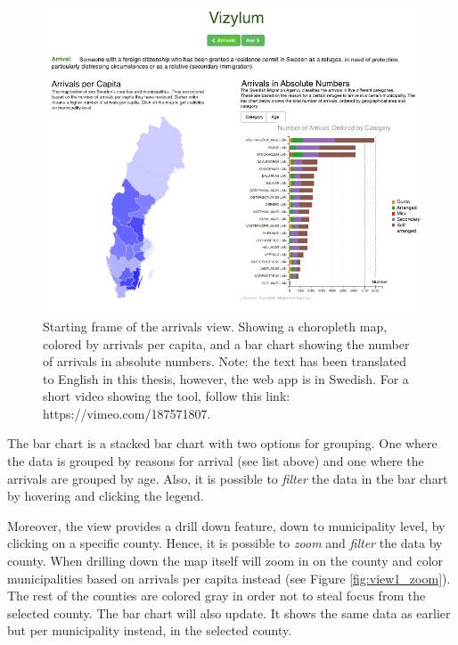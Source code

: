 \documentclass{acmtog} %
\begin{document}
\begin{figure}
\centering
\includegraphics[width=\textwidth]{img/view1_start_en.png}
\caption{Starting frame of the arrivals view. Showing a choropleth map, colored by arrivals per capita, and a bar chart showing the number of arrivals in absolute numbers. Note: the text has been translated to English in this thesis, however, the web app is in Swedish. For a short video showing the tool, follow this link: https://vimeo.com/187571807.}
\label{fig:view1_start}
\end{figure}

The bar chart is a stacked bar chart with two options for grouping. One where the data is grouped by reasons for arrival (see list above) and one where the arrivals are grouped by age. Also, it is possible to \emph{filter} the data in the bar chart by hovering and clicking the legend.

Moreover, the view provides a drill down feature, down to municipality level, by clicking on a specific county. Hence, it is possible to \emph{zoom} and \emph{filter} the data by county. When drilling down the map itself will zoom in on the county and color municipalities based on arrivals per capita instead (see Figure \ref{fig:view1_zoom}). The rest of the counties are colored gray in order not to steal focus from the selected county. The bar chart will also update. It shows the same data as earlier but per municipality instead, in the selected county. 
\end{document}
